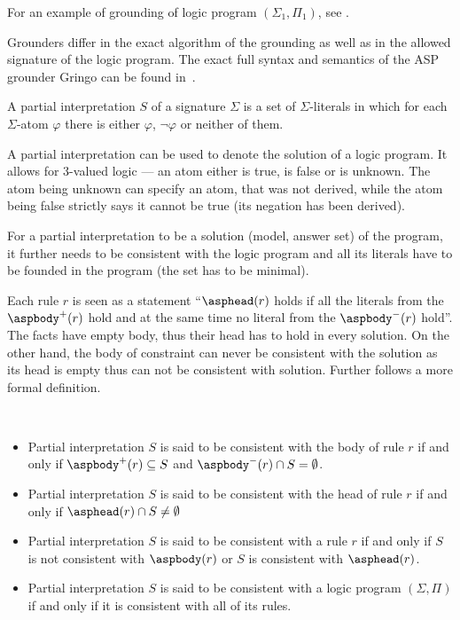 For an example of grounding of logic program $(\Sigma_1, \Pi_1)$, see .

Grounders differ in the exact algorithm of the grounding as well as in the
allowed signature of the logic program.
The exact full syntax and semantics
of the ASP grounder Gringo can be found in~\cite{GEBSER_2015}.


\begin{definition}
    A partial interpretation $S$ of a signature $\Sigma$ is a set
    of $\Sigma$-literals in which for each $\Sigma$-atom $\varphi$
    there is either $\varphi$, $\neg\varphi$ or neither of them.
\end{definition}


A partial interpretation can be used to denote the solution of a logic program.
It allows for 3-valued logic --- an atom either is true, is false or is unknown.
The atom being unknown can specify an atom, that was not derived,
while the atom being false strictly says it cannot be true (its negation has been derived).

For a partial interpretation to be a solution (model, answer set) of the program,
it further needs to be consistent with the logic program
and all its literals have to be founded in the program (the set has to be minimal).

Each rule $r$ is seen as a statement ``$\asphead(r)$ holds
if all the literals from the $\aspbody^+(r)$ hold
and at the same time no literal from the $\aspbody^-(r)$ hold''.
The facts have empty body, thus their head has to hold in every solution.
On the other hand, the body of constraint can never be consistent with
the solution as its head is empty thus can not be consistent with solution.
Further follows a more formal definition.

\begin{definition}\label{consistent_interpretation}\phantom{}\\\vspace{-1em}
    \begin{itemize}
\item Partial interpretation $S$ is said to be consistent with the body of rule $r$
    if and only if $\aspbody^+(r) \subseteq S$ and
    $\aspbody^-(r) \cap S = \emptyset$.

\item Partial interpretation $S$ is said to be consistent with the head of rule $r$
    if and only if $\asphead(r) \cap S \neq \emptyset$

\item Partial interpretation $S$ is said to be consistent with a rule $r$
    if and only if $S$ is not consistent with $\aspbody(r)$
    or $S$ is consistent with $\asphead(r)$.

\item Partial interpretation $S$ is said to be consistent with a logic program
    $(\Sigma, \Pi)$ if and only if it is consistent with all of its rules.
    \end{itemize}
\end{definition}

